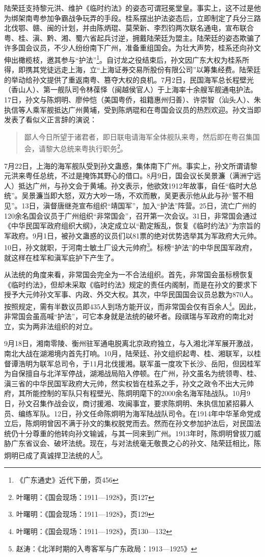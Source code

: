 陆荣廷支持黎元洪、维护《临时约法》的姿态可谓冠冕堂皇。事实上，这不过是他为绑架南粤参加争霸战争玩弄的手段。桂系摆出护法姿态后，立即制定了兵分三路北伐鄂、赣、闽的计划，并由陈炳琨、莫荣新、李烈钧两次联名通电，宣布联合粤、桂、滇、黔、湘、蜀六省起兵讨逆，拥戴陆荣廷为盟主。陆荣廷的姿态欺骗了许多国会议员，不少人纷纷南下广州，准备重组国会。为壮大声势，桂系还向孙文伸出橄榄枝，邀其参与“护法”\footnote{《广东通史》近代下册，页456}。自讨龙之役结束后，孙文因广东大权为桂系所得，即携其党徒远走上海，立“上海证券交易所股份有限公司”以筹集经费。陆荣廷的举动给孙文提供了重返南粤、篡夺大权的良机。7月2日，民国海军总长程壁光（香山人）、第一舰队司令林葆怿（闽越侯官人）于上海率十余艘军舰通电护法。17日，孙文与陈炯明、廖仲恺（美国粤侨，祖籍惠州归善）、许崇智（汕头人）、朱执信等人乘军舰抵达广州黄埔，受到陈炳琨和在粤国会议员的热烈欢迎。孙文当即发表了看似义正言辞的演说：



\begin{quote}
鄙人今日所望于诸君者，即日联电请海军全体舰队来粤，然后即在粤召集国会，请黎大总统来粤执行职务\footnote{叶曙明：《国会现场：1911—1928》，页127}。
\end{quote}

7月22日，上海的海军舰队受到孙文蛊惑，集体南下广州。事实上，孙文所谓请黎元洪来粤任总统，不过是掩饰其野心的借口。8月9日，国会议长吴景濂（满洲宁远人）抵达广州，与孙文会于黄埔。孙文表示，他欲效1912年故事，自任“临时大总统”。吴景濂当即大怒，双方大吵一场，不欢而散，吴更表示他从此与孙“誓不相见”。13日，滇督唐继尧宣布组织“靖国军”，加入“护法”阵营。25日，流亡广州的120余名国会议员于广州组织“非常国会”，召开第一次会议。31日，非常国会通过《中华民国军政府组织大纲》，决定成立以“勘定叛乱，恢复《临时约法》”为宗旨的军政府。9月1日，被孙文蛊惑的议员们以81票的绝对优势选举其为军政府大元帅。10日，孙文就职，于河南士敏土厂设大元帅府\footnote{叶曙明：《国会现场：1911—1928》，页129}。标榜“护法”的中华民国军政府，就这样在桂军和滇军庇护下产生了。

从法统的角度来看，非常国会完全为一不合法组织。首先，非常国会虽标榜恢复《临时约法》，但却未采取《临时约法》规定的责任内阁制，而是在孙文的要求下授予大元帅孙文军事、内政、外交大权。其次，中华民国国会议员总数为870人。按照规定，需有半数议员即435人到场方能开议，而非常国会仅有百余人\footnote{叶曙明：《国会现场：1911—1928》，页130—132}。因此，非常国会虽高喊“护法”，可它本身就是法统的破坏者。段祺瑞与军政府的南北对立，实为两非法组织的对立。

9月18日，湘南零陵、衡州驻军通电脱离北京政府独立，与入湘北洋军展开激战，南北大战在湖湘境内首先打响。10月，陆荣廷、孙文组织起粤、桂、湘联军，以桂督谭浩明为联军总司令，于11月北伐援湘。联军虽一度攻下长沙、岳阳，但因桂军为自保擅自与北洋军停战，湖湘战局陷入停顿。在广州，孙文虽名为统领粤、桂、滇三省的中华民国军政府大元帅，然实权皆在桂系之手，孙文之政令不出大元帅府，其所能控制的军队只有程壁光、陈炯明麾下的2000余名海军陆战队。10月9日，孙文召集作战会议，商讨援湘、攻闽事宜，要求陈炯明、朱执信加紧招募人员、编练军队。12日，孙文任命陈炯明为海军陆战队司令。在1914年中华革命党成立后，陈炯明曾因不满于孙文的集权脱党而去。然而在孙文参加护法后，对民国法统仍十分尊重的他转向孙文输诚，与其一同来到广州。1913年时，陈炯明曾拔刀威胁广东省议会、破坏法统。现在，与对法统毫无敬畏之心的孙文、陆荣廷相比，陈炯明已成了真诚捍卫法统的人\footnote{赵涛：《北洋时期的入粤客军与广东政局：1913—1925》}。

